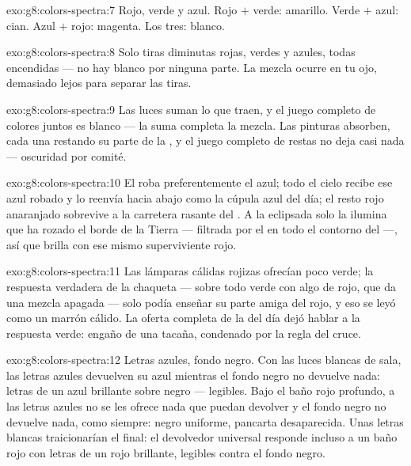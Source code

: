 \begin{solution}{exo:g8:colors-spectra:7}
Rojo, verde y azul. Rojo $+$ verde: amarillo. Verde $+$ azul: cian.
Azul $+$ rojo: magenta. Los tres: blanco.
\end{solution}

\begin{solution}{exo:g8:colors-spectra:8}
Solo tiras diminutas rojas, verdes y azules, todas encendidas --- no
hay blanco por ninguna parte. La mezcla ocurre en tu ojo, demasiado
lejos para separar las tiras.
\end{solution}

\begin{solution}{exo:g8:colors-spectra:9}
Las luces suman lo que traen, y el juego completo de colores
juntos es blanco --- la suma completa la mezcla. Las pinturas absorben,
cada una restando su parte de la , y el juego completo de
restas no deja casi nada --- oscuridad por comité.
\end{solution}

\begin{solution}{exo:g8:colors-spectra:10}
El  roba preferentemente el azul; todo el cielo recibe ese azul
robado y lo reenvía hacia abajo como la cúpula azul del día; el resto
rojo anaranjado sobrevive a la carretera rasante del
. A la  eclipsada solo la ilumina
 que ha rozado el borde de la Tierra --- filtrada por el
 en todo el contorno del  ---, así que brilla con
ese mismo superviviente rojo.
\end{solution}

\begin{solution}{exo:g8:colors-spectra:11}
Las lámparas cálidas rojizas ofrecían poco verde; la respuesta
verdadera de la chaqueta --- sobre todo verde con algo de rojo, que da
una mezcla apagada --- solo podía enseñar su parte amiga del rojo, y
eso se leyó como un marrón cálido. La oferta completa de la  del día
dejó hablar a la respuesta verde: engaño de una  tacaña,
condenado por la regla del cruce.
\end{solution}

\begin{solution}{exo:g8:colors-spectra:12}
Letras azules, fondo negro. Con las luces blancas de sala, las letras
azules devuelven su azul mientras el fondo negro no devuelve nada:
letras de un azul brillante sobre negro --- legibles. Bajo el baño rojo
profundo, a las letras azules no se les ofrece nada que puedan devolver
y el fondo negro no devuelve nada, como siempre: negro uniforme,
pancarta desaparecida. Unas letras blancas traicionarían el final: el
devolvedor universal responde incluso a un baño rojo con letras de un
rojo brillante, legibles contra el fondo negro.
\end{solution}

